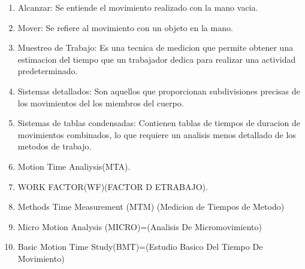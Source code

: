 \begin{enumerate}
    \item Alcanzar: Se entiende el movimiento realizado con la mano vacia.
    \item Mover: Se refiere al movimiento con un objeto en la mano.
    \item Muestreo de Trabajo: Es una tecnica de medicion que permite obtener una estimacion del tiempo que un trabajador dedica para realizar una actividad predeterminado.
    \item Sistemas detallados: Son aquellos que proporcionan subdivisiones precisas de los movimientos del los miembros del cuerpo.
    \item Sistemas de tablas condensadas: Contienen tablas de tiempos de duracion de movimientos combinados, lo que requiere un analisis menos detallado de los metodos de trabajo.
     \item Motion Time Analiysis(MTA).
    \item WORK FACTOR(WF)(FACTOR D ETRABAJO).
    \item Methods Time Measurement (MTM) (Medicion de Tiempos de Metodo)
    \item Micro Motion Analysis (MICRO)=(Analisis De Micromovimiento)
    \item Basic Motion Time Study(BMT)=(Estudio Basico Del Tiempo De Movimiento)
\end{enumerate}